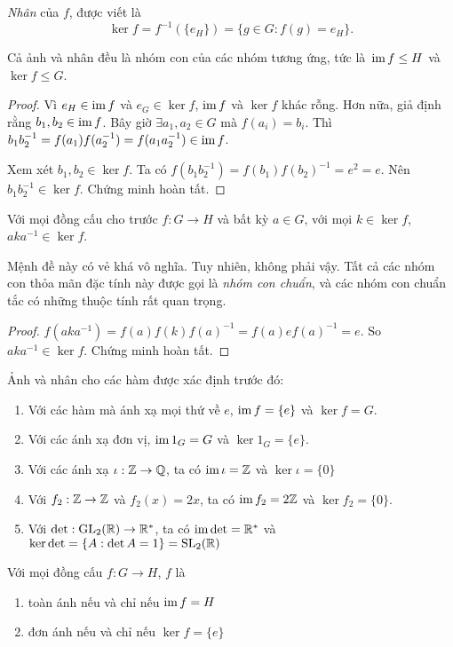 \begin{defi}
  \emph{Nhân} của $f$, được viết là
  \[
    \ker f = f^{-1}(\{e_H\}) = \{g\in G:f(g)=e_H\}.
  \]
\end{defi}

\begin{prop}
  Cả ảnh và nhân đều là nhóm con của các nhóm tương ứng, tức là\ $\operatorname{im} f\leq H$ và $\ker f \leq G$.
\end{prop}

\begin{proof}
  Vì $e_H\in \operatorname{im} f$ và $e_G\in \ker f$, $\operatorname{im} f$ và $\ker f$ khác rỗng. Hơn nữa, giả định rằng $b_1, b_2\in \operatorname{im} f$. Bây giờ $\exists a_1, a_2 \in G$ mà $f(a_i) = b_i$. Thì $b_1b_2^{-1} = f(a_1)f(a_2^{-1}) = f(a_1a_2^{-1})\in \operatorname{im} f$.

  Xem xét $b_1,b_2\in \ker f$. Ta có $f(b_1b_2^{-1}) = f(b_1)f(b_2)^{-1} = e^2 = e$. Nên $b_1b_2^{-1}\in \ker f$.
  Chứng minh hoàn tất.
\end{proof}

\begin{prop}
  Với mọi đồng cấu cho trước $f:G\rightarrow H$ và bất kỳ $a\in G$, với mọi $k\in \ker f$, $aka^{-1}\in\ker f$.
\end{prop}
Mệnh đề này có vẻ khá vô nghĩa. Tuy nhiên, không phải vậy. Tất cả các nhóm con thỏa mãn đặc tính này được gọi là \emph{nhóm con chuẩn}, và các nhóm con chuẩn tắc có những thuộc tính rất quan trọng.

\begin{proof}
  $f(aka^{-1}) = f(a)f(k)f(a)^{-1} = f(a)ef(a)^{-1} = e$. So $aka^{-1}\in \ker f$. Chứng minh hoàn tất.
\end{proof}

\begin{eg}
  Ảnh và nhân cho các hàm được xác định trước đó:
  \begin{enumerate}
    \item Với các hàm mà ánh xạ mọi thứ về $e$, $\operatorname{im} f = \{e\}$ và $\ker f = G$.
    \item Với các ánh xạ đơn vị, $\operatorname{im} 1_G = G$ và $\ker 1_G = \{e\}$.
    \item Với các ánh xạ $\iota: \mathbb{Z}\rightarrow\mathbb{Q}$, ta có $\operatorname{im} \iota = \mathbb{Z}$ và $\ker \iota = \{0\}$
    \item Với $f_2:\mathbb{Z}\rightarrow\mathbb{Z}$ và $f_2(x) = 2x$, ta có $\operatorname{im} f_2 = 2\mathbb{Z}$ và $\ker f_2 = \{0\}$.
    \item Với $\det: \mathrm{GL}_2(\mathbb{R}) \rightarrow \mathbb{R}^*$, ta có $\operatorname{im} \det = \mathbb{R}^*$ và $\ker \det = \{A:\det A = 1\} = \mathrm{SL}_2(\mathbb{R})$
  \end{enumerate}
\end{eg}
\begin{prop}
  Với mọi đồng cấu $f:G\rightarrow H$, $f$ là
  \begin{enumerate}
    \item toàn ánh nếu và chỉ nếu $\operatorname{im} f = H$
    \item đơn ánh nếu và chỉ nếu $\ker f = \{e\}$
  \end{enumerate}
\end{prop}

